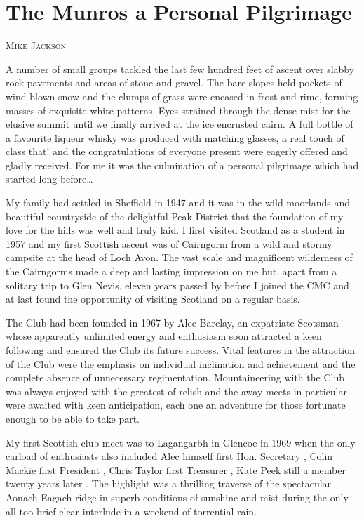 \documentclass[a5paper,openany,font 10pt]{scrbook}
\makeatletter
\newcommand{\chapterauthor}[1]{%
{\parindent0pt\vspace*{-5pt}%
\linespread{1.1}\large\scshape#1%
\par\nobreak\vspace*{35pt}}
\@afterheading%
}
\makeatother
\begin{document}
\chapter{The Munros a Personal Pilgrimage}
\label{sec:orgdf52995}
\chapterauthor{Mike Jackson}

A number of small groups tackled the last few hundred feet
of ascent over slabby rock pavements and areas of stone and
gravel. The bare slopes held pockets of wind blown snow and the
clumps of grass were encased in frost and rime, forming masses of
exquisite white patterns. Eyes strained through the dense mist
for the elusive summit until we finally arrived at the ice encrusted cairn.
A full bottle of a favourite liqueur whisky was
produced   with matching glasses, a real touch of class that!
and the congratulations of everyone present were eagerly offered
and gladly received. For me it was the culmination of a personal
pilgrimage which had started long before\ldots{}

My family had settled in Sheffield in 1947 and it was in the
wild moorlands and beautiful countryside of the delightful Peak
District that the foundation of my love for the hills was well
and truly laid. I first visited Scotland as a student in 1957 and
my first Scottish ascent was of Cairngorm from a wild and stormy
campsite at the head of Loch Avon. The vast scale and magnificent
wilderness of the Cairngorms made a deep and lasting impression
on me but, apart from a solitary trip to Glen Nevis, eleven years
passed by before I joined the CMC and at last found the
opportunity of visiting Scotland on a regular basis.

The Club had been founded in 1967 by Alec Barclay, an
expatriate Scotsman whose apparently unlimited energy and
enthusiasm soon attracted a keen following and ensured the Club
its future success. Vital features in the attraction of the Club
were the emphasis on individual inclination and achievement and
the complete absence of unnecessary regimentation. Mountaineering
with the Club was always enjoyed with the greatest of relish and
the away meets in particular were awaited with keen anticipation,
each one an adventure for those fortunate enough to be able to
take part.

My first Scottish club meet was to Lagangarbh in Glencoe in
1969 when the only carload of enthusiasts also included Alec
himself  first Hon. Secretary , Colin Mackie  first President ,
Chris Taylor  first Treasurer , Kate Peek  still a member twenty
years later . The highlight was a thrilling traverse of the
spectacular Aonach Eagach ridge in superb conditions of sunshine
and mist during the only all too brief clear interlude in a
weekend of torrential rain.
\end{document}
